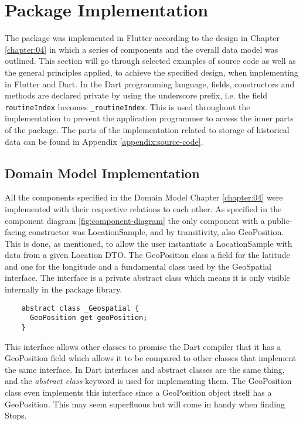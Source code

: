 \section{Package Implementation}
The package was implemented in Flutter according to the design in Chapter \ref{chapter:04} in which a series of components and the overall data model was outlined. This section will go through selected examples of source code as well as the general principles applied, to achieve the specified design, when implementing in Flutter and Dart. In the Dart programming language, fields, constructors and methods are declared private by using the underscore prefix, i.e. the field \verb|routineIndex| becomes \verb|_routineIndex|. This is used throughout the implementation to prevent the application programmer to access the inner parts of the package. The parts of the implementation related to storage of historical data can be found in Appendix \ref{appendix:source-code}.

\subsection{Domain Model Implementation}
All the components specified in the Domain Model Chapter \ref{chapter:04} were implemented with their respective relations to each other. As specified in the component diagram \ref{fig:component-diagram} the only component with a public-facing constructor was LocationSample, and by transitivity, also GeoPosition. This is done, as mentioned, to allow the user instantiate a LocationSample with data from a given Location DTO. The GeoPosition class a field for the latitude and one for the longitude and a fundamental class used by the GeoSpatial interface. The interface is a private abstract class which means it is only visible internally in the package library.

\begin{verbatim}
    abstract class _Geospatial {
      GeoPosition get geoPosition;
    }
\end{verbatim}

This interface allows other classes to promise the Dart compiler that it has a GeoPosition field which allows it to be compared to other classes that implement the same interface. In Dart interfaces and abstract classes are the same thing, and the \textit{abstract class} keyword is used for implementing them. The GeoPosition class even implements this interface since a GeoPosition object itself has a GeoPosition. This may seem superfluous but will come in handy when finding Stops.

